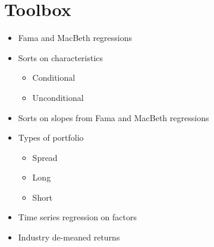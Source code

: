 
\section{Toolbox}

\begin{itemize}
  \item Fama and MacBeth regressions
  \item Sorts on characteristics
  \begin{itemize}
    \item Conditional
    \item Unconditional
  \end{itemize}
  \item Sorts on slopes from Fama and MacBeth regressions
  \item Types of portfolio
  \begin{itemize}
    \item Spread
    \item Long
    \item Short
  \end{itemize}
  \item Time series regression on factors
  \item Industry de-meaned returns
\end{itemize}

